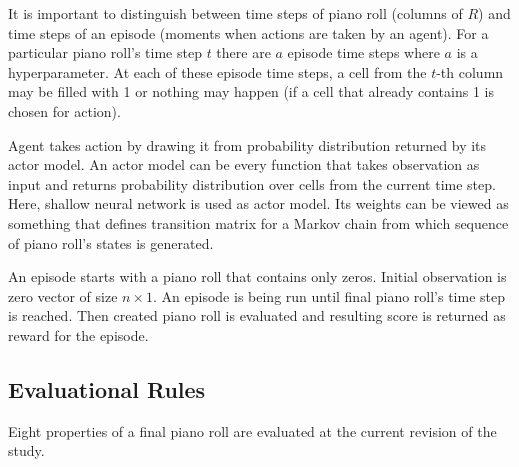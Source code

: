 \documentclass{article}
\begin{document}
It is important to distinguish between time steps of piano roll (columns of $R$) and time steps of an episode (moments when actions are taken by an agent). For a particular piano roll's time step $t$ there are $a$ episode time steps where $a$ is a hyperparameter. At each of these episode time steps, a cell from the $t$-th column may be filled with 1 or nothing may happen (if a cell that already contains 1 is chosen for action).

Agent takes action by drawing it from probability distribution returned by its actor model. An actor model can be every function that takes observation as input and returns probability distribution over cells from the current time step. Here, shallow neural network is used as actor model. Its weights can be viewed as something that defines transition matrix for a Markov chain from which sequence of piano roll's states is generated.

An episode starts with a piano roll that contains only zeros. Initial observation is zero vector of size $n \times 1$. An episode is being run until final piano roll's time step is reached. Then created piano roll is evaluated and resulting score is returned as reward for the episode.

\subsection{Evaluational Rules}
\label{subsec:setup}

Eight properties of a final piano roll are evaluated at the current revision of the study.
\end{document}
